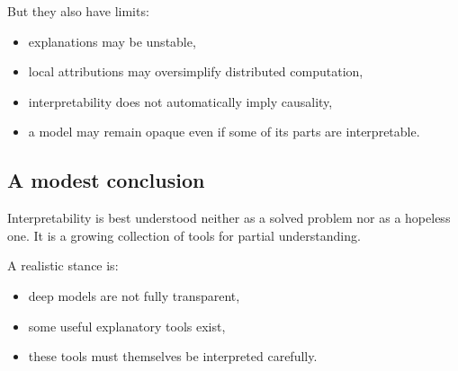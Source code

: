 But they also have limits:
\begin{itemize}
    \item explanations may be unstable,
    \item local attributions may oversimplify distributed computation,
    \item interpretability does not automatically imply causality,
    \item a model may remain opaque even if some of its parts are interpretable.
\end{itemize}

\subsection*{A modest conclusion}

Interpretability is best understood neither as a solved problem nor as a hopeless one.
It is a growing collection of tools for partial understanding.

\medskip

A realistic stance is:
\begin{itemize}
    \item deep models are not fully transparent,
    \item some useful explanatory tools exist,
    \item these tools must themselves be interpreted carefully.
\end{itemize}

